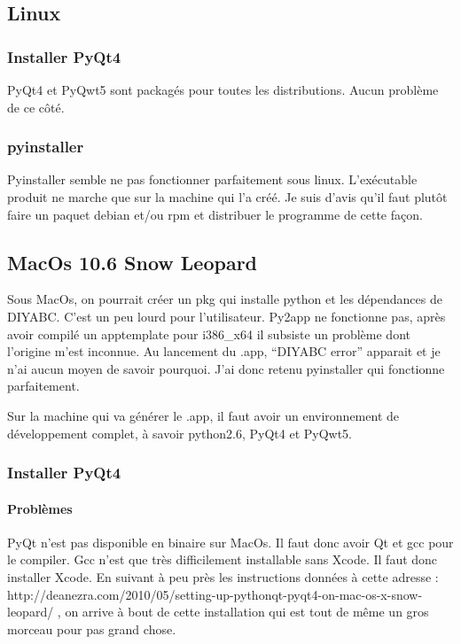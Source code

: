 \documentclass[12pt,a4paper]{article}
\begin{document}
    \subsection{Linux}
        \subsubsection{Installer PyQt4}
        PyQt4 et PyQwt5 sont packagés pour toutes les distributions. Aucun problème de ce côté.
        \subsubsection{pyinstaller}
        Pyinstaller semble ne pas fonctionner parfaitement sous linux. L'exécutable produit ne marche que
        sur la machine qui l'a créé. Je suis d'avis qu'il faut plutôt faire un paquet debian et/ou rpm
        et distribuer le programme de cette façon.

    \subsection{MacOs 10.6 Snow Leopard}
        Sous MacOs, on pourrait cr\'eer un pkg qui installe python et les d\'ependances de DIYABC. C'est un peu lourd
        pour l'utilisateur. Py2app ne fonctionne pas, après avoir compil\'e un apptemplate pour i386\_x64
        il subsiste un problème dont l'origine m'est inconnue. Au lancement
        du .app, ``DIYABC error'' apparait et je n'ai aucun moyen de savoir pourquoi. J'ai donc retenu pyinstaller qui fonctionne parfaitement.

        Sur la machine qui va g\'en\'erer le .app, il faut avoir un environnement de d\'eveloppement complet, à savoir
        python2.6, PyQt4 et PyQwt5.

        \subsubsection{Installer PyQt4}

        \paragraph{Problèmes}

        PyQt n'est pas disponible en binaire sur MacOs. Il faut donc avoir Qt et gcc pour le compiler. 
        Gcc n'est que très difficilement installable sans Xcode. Il faut donc installer Xcode.
        En suivant à peu près les instructions données à cette adresse : \newline
        http://deanezra.com/2010/05/setting-up-pythonqt-pyqt4-on-mac-os-x-snow-leopard/\newline
        , on arrive à bout de cette installation qui est tout de même un gros morceau pour pas grand chose.
    
\end{document}
